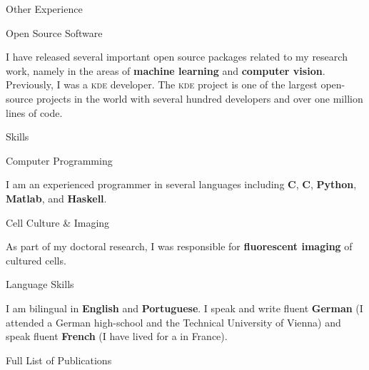 \documentclass{article}
\renewcommand\section[1]{%
    \par\vspace{2em}%
    {\subhead #1}%
    \par\vspace{1em}%
}
\newcommand\cvitem[2][\relax]{%
    \par\vspace{.8em}
    \if\relax#1\else{\Date \textcolor{medg}{#1}}\hspace{1em}\fi%
    {\CvItem #2}%
    \par\vspace{.4em}
}
\begin{document}
\section{Other Experience}

\cvitem{Open Source Software}
I have released several important open source packages related to my research
work, namely in the areas of \textbf{machine learning} and \textbf{computer
vision}. Previously, I was a \textsc{kde} developer. The \textsc{kde} project
is one of the largest open-source projects in the world with several hundred
developers and over one million lines of code.

\section{Skills}

\cvitem{Computer Programming}
I am an experienced programmer in several languages including \textbf{C},
\textbf{C\raisebox{.1em}{\tiny \bf ++}}, \textbf{Python}, \textbf{Matlab}, and
\textbf{Haskell}.

\cvitem{Cell Culture \& Imaging}
As part of my doctoral research, I was responsible for \textbf{fluorescent
imaging} of cultured cells.

\cvitem{Language Skills}
I am bilingual in \textbf{English} and \textbf{Portuguese}. I speak and write
fluent \textbf{German} (I attended a German high-school and the Technical
University of Vienna) and speak fluent \textbf{French} (I have lived for a in
France).

\vspace{4.1em}
\section{Full List of Publications}
\vspace{2em}
\end{document}
